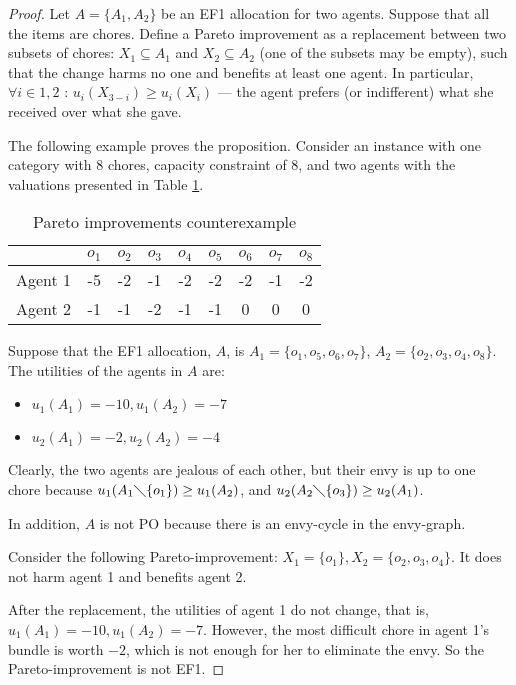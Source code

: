 \documentclass[sigconf]{aamas}
\theoremstyle{definition}
\begin{document}
\begin{proof}
Let $A = \{A_1,A_2\}$ be an EF1 allocation for two agents.
Suppose that all the items are chores.
Define a Pareto improvement as a replacement between two subsets of chores: $X_1 \subseteq A_1$ and $X_2 \subseteq A_2$ (one of the subsets may be empty), such that the change harms no one and benefits at least one agent.
In particular, $\forall i \in {1,2}$ : $u_i(X_{3-i}) \geq u_i(X_i)$ --- the agent prefers (or indifferent) what she received over what she gave.

The following example proves the proposition. Consider
an instance with one category with 8 chores, capacity constraint of 8, and two agents with the valuations presented in Table \ref{tab:pareto-improve}.

\begin{table}[]
    \caption{Pareto improvements counterexample}
    \label{tab:pareto-improve}
    \centering
    \begin{tabular}{||c | c c c c c c c c||} 
    \hline
    {} & {$o_1$} & {$o_2$} & {$o_3$} & {$o_4$} & {$o_5$} & {$o_6$} & {$o_7$} & {$o_8$} \\ [0.5ex] 
    \hline\hline
    Agent 1 & -5 & -2 & -1 & -2 & -2 & -2 & -1 & -2 \\
    \hline
    Agent 2 & -1 & -1 & -2 & -1 & -1 & 0 & 0 & 0 \\ 
    \hline
    \end{tabular} 
\end{table}
Suppose that the EF1 allocation, $A$, is $A_1=\{o_1,o_5,o_6,o_7\}$, $A_2=\{o_2,o_3,o_4,o_8\}$. 
The utilities of the agents in $A$ are: 
\begin{itemize}
\item $u_1(A_1) = -10, u_1(A_2) = -7$
\item $u_2(A_1) = -2, u_2(A_2) = -4$
\end{itemize}

Clearly, the two agents are jealous of each other, but their envy is up to one chore because $u_1(A_1 \diagdown \{o_1\}) \geq u_1(A_2)$, and $u_2(A_2 \diagdown \{o_3\}) \geq u_2(A_1)$. 

In addition, $A$ is not PO because there is an envy-cycle in the envy-graph.

Consider the following Pareto-improvement: $X_1=\{o_1\}, X_2=\{o_2,o_3,o_4\}$. It  does not harm agent 1 and benefits agent 2. 

After the replacement, the utilities of agent 1 do not change, that is, $u_1(A_1) = -10, u_1(A_2) = -7$. However, the most difficult chore in agent 1's bundle is worth $-2$, which is not enough for her to eliminate the envy. So the Pareto-improvement is not EF1.
\end{proof}
\end{document}

